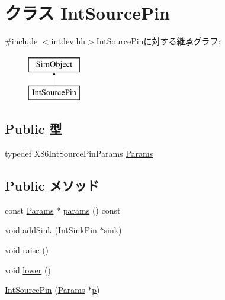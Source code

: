\hypertarget{classX86ISA_1_1IntSourcePin}{
\section{クラス IntSourcePin}
\label{classX86ISA_1_1IntSourcePin}
}


{\ttfamily \#include $<$intdev.hh$>$}IntSourcePinに対する継承グラフ:\begin{figure}[H]
\begin{center}
\leavevmode
\includegraphics[height=2cm]{classX86ISA_1_1IntSourcePin}
\end{center}
\end{figure}
\subsection*{Public 型}
\begin{DoxyCompactItemize}
\item 
typedef X86IntSourcePinParams \hyperlink{classX86ISA_1_1IntSourcePin_aa726887946ee64861aed7d5a9e2f240a}{Params}
\end{DoxyCompactItemize}
\subsection*{Public メソッド}
\begin{DoxyCompactItemize}
\item 
const \hyperlink{classX86ISA_1_1IntSourcePin_aa726887946ee64861aed7d5a9e2f240a}{Params} $\ast$ \hyperlink{classX86ISA_1_1IntSourcePin_acd3c3feb78ae7a8f88fe0f110a718dff}{params} () const 
\item 
void \hyperlink{classX86ISA_1_1IntSourcePin_a61bae9886ca37fefa07b8ebc2cbfa4c7}{addSink} (\hyperlink{classX86ISA_1_1IntSinkPin}{IntSinkPin} $\ast$sink)
\item 
void \hyperlink{classX86ISA_1_1IntSourcePin_ad9c27f2d106edb222bc33c4bfc384f58}{raise} ()
\item 
void \hyperlink{classX86ISA_1_1IntSourcePin_abb6fca0f0f0ba34b180f807b0dab4e92}{lower} ()
\item 
\hyperlink{classX86ISA_1_1IntSourcePin_a7fd9666d5032b7a1a9687c8e3a9149bd}{IntSourcePin} (\hyperlink{classX86ISA_1_1IntSourcePin_aa726887946ee64861aed7d5a9e2f240a}{Params} $\ast$\hyperlink{namespaceX86ISA_af675c1d542a25b96e11164b80809a856}{p})
\end{DoxyCompactItemize}

